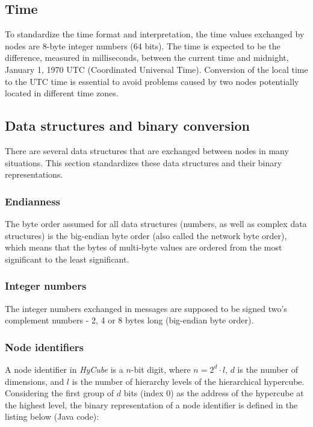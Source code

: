 \subsection{Time}

To standardize the time format and interpretation, the time values exchanged by nodes are 8-byte integer numbers (64 bits). The time is expected to be the difference, measured in milliseconds, between the current time and midnight, January 1, 1970 UTC (Coordinated Universal Time). Conversion of the local time to the UTC time is essential to avoid problems caused by two nodes potentially located in different time zones.



\subsection{Data structures and binary conversion}

There are several data structures that are exchanged between nodes in many situations. This section standardizes these data structures and their binary representations.



\subsubsection{Endianness}

The byte order assumed for all data structures (numbers, as well as complex data structures) is the big-endian byte order (also called the network byte order), which means that the bytes of multi-byte values are ordered from the most significant to the least significant.



\subsubsection{Integer numbers}

The integer numbers exchanged in messages are supposed to be signed two's complement numbers - 2, 4 or 8 bytes long (big-endian byte order).



\subsubsection{Node identifiers}

A node identifier in \emph{HyCube} is a $n$-bit digit, where $n = 2^d \cdot l$, $d$ is the number of dimensions, and $l$ is the number of hierarchy levels of the hierarchical hypercube. Considering the first group of $d$ bits (index 0) as the address of the hypercube at the highest level, the binary representation of a node identifier is defined in the listing below (Java code):

